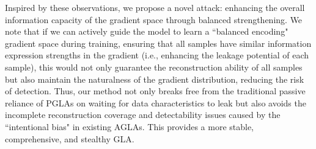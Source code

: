Inspired by these observations, we propose a novel attack: enhancing the overall information capacity of the gradient space through balanced strengthening. We note that if we can actively guide the model to learn a ``balanced encoding" gradient space during training, ensuring that all samples have similar information expression strengths in the gradient (i.e., enhancing the leakage potential of each sample), this would not only guarantee the reconstruction ability of all samples but also maintain the naturalness of the gradient distribution, reducing the risk of detection. Thus, our method not only breaks free from the traditional passive reliance of PGLAs on waiting for data characteristics to leak but also avoids the incomplete reconstruction coverage and detectability issues caused by the ``intentional bias" in existing AGLAs. This provides a more stable, comprehensive, and stealthy GLA.


